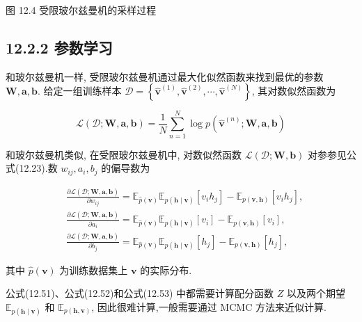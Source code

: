 \documentclass[10pt]{article}
\begin{document}
图 12.4 受限玻尔兹曼机的采样过程

\subsection*{12.2.2 参数学习}
和玻尔兹曼机一样, 受限玻尔兹曼机通过最大化似然函数来找到最优的参数 $\boldsymbol{W}, \boldsymbol{a}, \boldsymbol{b}$. 给定一组训练样本 $\mathcal{D}=\left\{\hat{\boldsymbol{v}}^{(1)}, \hat{\boldsymbol{v}}^{(2)}, \cdots, \hat{\boldsymbol{v}}^{(N)}\right\}$, 其对数似然函数为


\begin{equation*}
\mathcal{L}(\mathcal{D} ; \boldsymbol{W}, \boldsymbol{a}, \boldsymbol{b})=\frac{1}{N} \sum_{n=1}^{N} \log p\left(\hat{\boldsymbol{v}}^{(n)} ; \boldsymbol{W}, \boldsymbol{a}, \boldsymbol{b}\right) \tag{12.50}
\end{equation*}


和玻尔兹曼机类似, 在受限玻尔兹曼机中, 对数似然函数 $\mathcal{L}(\mathcal{D} ; \boldsymbol{W}, \boldsymbol{b})$ 对参参见公式(12.23).数 $w_{i j}, a_{i}, b_{j}$ 的偏导数为


\begin{align*}
& \frac{\partial \mathcal{L}(\mathcal{D} ; \boldsymbol{W}, \boldsymbol{a}, \boldsymbol{b})}{\partial w_{i j}}=\mathbb{E}_{\hat{p}(\boldsymbol{v})} \mathbb{E}_{p(\boldsymbol{h} \mid \boldsymbol{v})}\left[v_{i} h_{j}\right]-\mathbb{E}_{p(\boldsymbol{v}, \boldsymbol{h})}\left[v_{i} h_{j}\right],  \tag{12.51}\\
& \frac{\partial \mathcal{L}(\mathcal{D} ; \boldsymbol{W}, \boldsymbol{a}, \boldsymbol{b})}{\partial a_{i}}=\mathbb{E}_{\hat{p}(\boldsymbol{v})} \mathbb{E}_{p(\boldsymbol{h} \mid \boldsymbol{v})}\left[v_{i}\right]-\mathbb{E}_{p(\boldsymbol{v}, \boldsymbol{h})}\left[v_{i}\right],  \tag{12.52}\\
& \frac{\partial \mathcal{L}(\mathcal{D} ; \boldsymbol{W}, \boldsymbol{a}, \boldsymbol{b})}{\partial b_{j}}=\mathbb{E}_{\hat{p}(\boldsymbol{v})} \mathbb{E}_{p(\boldsymbol{h} \mid \boldsymbol{v})}\left[h_{j}\right]-\mathbb{E}_{p(\boldsymbol{v}, \boldsymbol{h})}\left[h_{j}\right], \tag{12.53}
\end{align*}


其中 $\hat{p}(\boldsymbol{v})$ 为训练数据集上 $\boldsymbol{v}$ 的实际分布.

公式(12.51)、公式(12.52)和公式(12.53) 中都需要计算配分函数 $Z$ 以及两个期望 $\mathbb{E}_{p(\boldsymbol{h} \mid \boldsymbol{v})}$ 和 $\mathbb{E}_{p(\boldsymbol{h}, \boldsymbol{v})}$, 因此很难计算,一般需要通过 MCMC 方法来近似计算.
\end{document}

